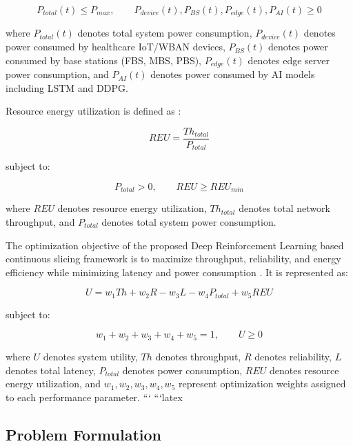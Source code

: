 \documentclass[10pt,journal,compsoc]{IEEEtran}
\begin{document}
\begin{equation}
P_{total}(t)\leq P_{max}, \qquad 
P_{device}(t),P_{BS}(t),P_{edge}(t),P_{AI}(t)\geq0
\end{equation}

where $P_{total}(t)$ denotes total system power consumption, $P_{device}(t)$ denotes power consumed by healthcare IoT/WBAN devices, $P_{BS}(t)$ denotes power consumed by base stations (FBS, MBS, PBS), $P_{edge}(t)$ denotes edge server power consumption, and $P_{AI}(t)$ denotes power consumed by AI models including LSTM and DDPG.

Resource energy utilization is defined as \cite{donatti2025energy}:

\begin{equation}
REU=\frac{Th_{total}}{P_{total}}
\end{equation}

subject to:

\begin{equation}
P_{total}>0, \qquad REU\geq REU_{min}
\end{equation}

where $REU$ denotes resource energy utilization, $Th_{total}$ denotes total network throughput, and $P_{total}$ denotes total system power consumption.

The optimization objective of the proposed Deep Reinforcement Learning based continuous slicing framework is to maximize throughput, reliability, and energy efficiency while minimizing latency and power consumption \cite{saleh2025hybridrl,tariq2025ddpgv2x,kumar2025lstmddpg}. It is represented as:

\begin{equation}
U=w_1Th+w_2R-w_3L-w_4P_{total}+w_5REU
\end{equation}

subject to:

\begin{equation}
w_1+w_2+w_3+w_4+w_5=1, \qquad U\geq0
\end{equation}

where $U$ denotes system utility, $Th$ denotes throughput, $R$ denotes reliability, $L$ denotes total latency, $P_{total}$ denotes power consumption, $REU$ denotes resource energy utilization, and $w_1,w_2,w_3,w_4,w_5$ represent optimization weights assigned to each performance parameter.
```
```latex
\subsection{Problem Formulation}\label{Sec4}
\end{document}

